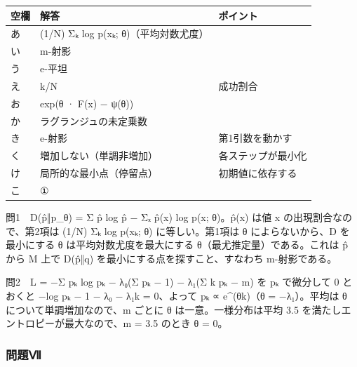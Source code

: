 \documentclass[
  10pt,
  a4paper,
]{article}
\begin{document}
\begin{longtable}[]{@{}lll@{}}
\toprule\noalign{}
空欄 & 解答 & ポイント \\
\midrule\noalign{}
\endhead
\bottomrule\noalign{}
\endlastfoot
あ & (1/N) Σ{\fallbackfont ₖ} log p(x{\fallbackfont ₖ};
θ)（平均対数尤度） & \\
い & m-射影 & \\
う & e-平坦 & \\
え & k/N & 成功割合 \\
お & exp(θ · F(x) − ψ(θ)) & \\
か & ラグランジュの未定乗数 & \\
き & e-射影 & 第1引数を動かす \\
く & 増加しない（単調非増加） & 各ステップが最小化 \\
け & 局所的な最小点（停留点） & 初期値に依存する \\
こ & ① & \\
\end{longtable}

問1　D({\fallbackfont p̂}‖p\_θ) = Σ {\fallbackfont p̂} log
{\fallbackfont p̂} − Σ{\fallbackfont ₓ} {\fallbackfont p̂}(x) log p(x;
θ)。{\fallbackfont p̂}(x) は値 x の出現割合なので、第2項は (1/N)
Σ{\fallbackfont ₖ} log p(x{\fallbackfont ₖ}; θ) に等しい。第1項は θ
によらないから、D を最小にする θ は平均対数尤度を最大にする
θ（最尤推定量）である。これは {\fallbackfont p̂} から M 上で
D({\fallbackfont p̂}‖q) を最小にする点を探すこと、すなわち m-射影である。

問2　L = −Σ p{\fallbackfont ₖ} log p{\fallbackfont ₖ} −
λ{\fallbackfont ₀}(Σ p{\fallbackfont ₖ} − 1) − λ{\fallbackfont ₁}(Σ k
p{\fallbackfont ₖ} − m) を p{\fallbackfont ₖ} で微分して 0 とおくと −log
p{\fallbackfont ₖ} − 1 − λ{\fallbackfont ₀} − λ{\fallbackfont ₁}k =
0、よって p{\fallbackfont ₖ} ∝ e\^{}(θk)（θ =
−λ{\fallbackfont ₁}）。平均は θ について単調増加なので、m ごとに θ
は一意。一様分布は平均 3.5 を満たしエントロピーが最大なので、m = 3.5
のとき θ = 0。

\hypertarget{ux554fux984cux2176}{%
\subsubsection{問題Ⅶ}\label{ux554fux984cux2176}}
\end{document}
